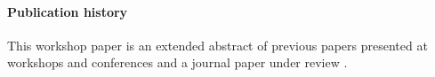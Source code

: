 \paragraph*{Publication history} This workshop paper is an extended abstract of previous papers presented at workshops and conferences \cite{claesuser,DBLP:conf/bnaic/ClaesBCGG19,ecai/BogaertsGCG20} and a journal paper under review \cite{bogaerts2020framework}.